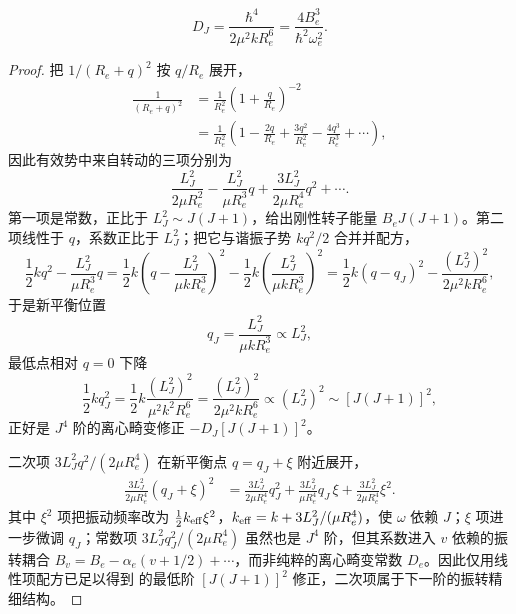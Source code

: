\begin{equation}
D_J
=\frac{\hbar^4}{2\mu^2kR_e^6}
=\frac{4B_e^3}{\hbar^2\omega_e^2}.
\label{eq:centrifugal-distortion-constant}
\end{equation}

\begin{proof}
把 \(1/(R_e+q)^2\) 按 \(q/R_e\) 展开，
\begin{align*}
 \frac1{(R_e+q)^2}
 &=\frac1{R_e^2}\left(1+\frac q{R_e}\right)^{-2}\\
 &=\frac1{R_e^2}
 \left(1-\frac{2q}{R_e}
 +\frac{3q^2}{R_e^2}
 -\frac{4q^3}{R_e^3}+\cdots\right),
\end{align*}
因此有效势中来自转动的三项分别为
\begin{equation*}
 \frac{L_J^2}{2\mu R_e^2}
 -\frac{L_J^2}{\mu R_e^3}q
 +\frac{3L_J^2}{2\mu R_e^4}q^2+\cdots.
\end{equation*}
第一项是常数，正比于 \(L_J^2\sim J(J+1)\)，给出刚性转子能量 \(B_eJ(J+1)\)。第二项线性于 \(q\)，系数正比于 \(L_J^2\)；把它与谐振子势 \(kq^2/2\) 合并并配方，
\begin{equation*}
 \frac12kq^2-\frac{L_J^2}{\mu R_e^3}q
 =\frac12k\left(q-\frac{L_J^2}{\mu kR_e^3}\right)^2
 -\frac12k\left(\frac{L_J^2}{\mu kR_e^3}\right)^2
 =\frac12k(q-q_J)^2
 -\frac{(L_J^2)^2}{2\mu^2kR_e^6},
\end{equation*}
于是新平衡位置
\begin{equation*}
 q_J=\frac{L_J^2}{\mu kR_e^3}\propto L_J^2,
\end{equation*}
最低点相对 \(q=0\) 下降
\begin{equation*}
 \frac12kq_J^2
 =\frac12k\frac{(L_J^2)^2}{\mu^2k^2R_e^6}
 =\frac{(L_J^2)^2}{2\mu^2kR_e^6}\propto (L_J^2)^2\sim [J(J+1)]^2,
\end{equation*}
正好是 \(J^4\) 阶的离心畸变修正 \(-D_J[J(J+1)]^2\)。

二次项 \(3L_J^2q^2/(2\mu R_e^4)\) 在新平衡点 \(q=q_J+\xi\) 附近展开，
\begin{align*}
 \frac{3L_J^2}{2\mu R_e^4}(q_J+\xi)^2
 &=\frac{3L_J^2}{2\mu R_e^4}q_J^2
 +\frac{3L_J^2}{\mu R_e^4}q_J\,\xi
 +\frac{3L_J^2}{2\mu R_e^4}\xi^2.
\end{align*}
其中 \(\xi^2\) 项把振动频率改为 \(\frac12k_{\rm eff}\xi^2\)，\(k_{\rm eff}=k+3L_J^2/(\mu R_e^4)\)，使 \(\omega\) 依赖 \(J\)；\(\xi\) 项进一步微调 \(q_J\)；常数项 \(3L_J^2q_J^2/(2\mu R_e^4)\) 虽然也是 \(J^4\) 阶，但其系数进入 \(v\) 依赖的振转耦合 \(B_v=B_e-\alpha_e(v+1/2)+\cdots\)，而非纯粹的离心畸变常数 \(D_e\)。因此仅用线性项配方已足以得到  的最低阶 \([J(J+1)]^2\) 修正，二次项属于下一阶的振转精细结构。
\end{proof}

